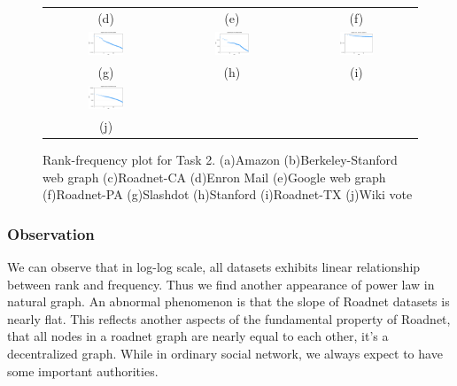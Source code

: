 \begin{figure}[!htbf]
\begin{center}
\begin{tabular}{c c c}
     (d) & (e) & (f)\\
     \includegraphics[width=0.3\textwidth]{FIG/t2_slashdot.png} &
     \includegraphics[width=0.3\textwidth]{FIG/t2_stanford.png} &
     \includegraphics[width=0.3\textwidth]{FIG/t2_tx.png}\\
     (g) & (h) & (i)\\
     \includegraphics[width=0.3\textwidth]{FIG/t2_wikivote.png} & &\\
     (j) & &
\end{tabular}
\caption{Rank-frequency plot for Task 2. (a)Amazon (b)Berkeley-Stanford web graph (c)Roadnet-CA (d)Enron Mail (e)Google web graph (f)Roadnet-PA (g)Slashdot (h)Stanford (i)Roadnet-TX (j)Wiki vote}
\label{t2:1}
\end{center}
\end{figure}

\subsubsection{Observation}
We can observe that in log-log scale, all datasets exhibits linear relationship between rank and frequency. Thus we find another appearance of power law in natural graph. An abnormal phenomenon is that the slope of Roadnet datasets is nearly flat. This reflects another aspects of the fundamental property of Roadnet, that all nodes in a roadnet graph are nearly equal to each other, it's a decentralized graph. While in ordinary social network, we always expect to have some important authorities. 




